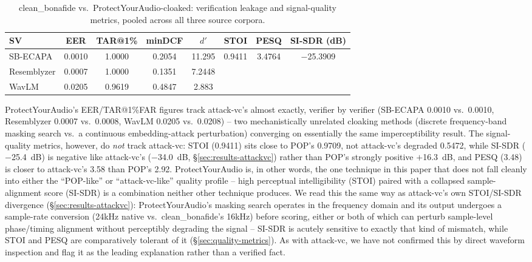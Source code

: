 \documentclass[11pt]{article}
\begin{document}
\begin{table}[H]
\centering
\caption{clean\_bonafide vs.\ ProtectYourAudio-cloaked: verification
leakage and signal-quality metrics, pooled across all three source
corpora.}
\label{tab:results-protectyouraudio}
\begin{tabular}{lccccccc}
\toprule
SV & EER & TAR@1\% & minDCF & $d'$ & STOI & PESQ & SI-SDR (dB) \\
\midrule
SB-ECAPA     & 0.0010 & 1.0000 & 0.2054 & 11.295 & \multirow{3}{*}{0.9411} & \multirow{3}{*}{3.4764} & \multirow{3}{*}{$-$25.3909} \\
Resemblyzer  & 0.0007 & 1.0000 & 0.1351 & 7.2448 & & & \\
WavLM        & 0.0205 & 0.9619 & 0.4847 & 2.883  & & & \\
\bottomrule
\end{tabular}
\end{table}

ProtectYourAudio's EER/TAR@1\%FAR figures track attack-vc's almost
exactly, verifier by verifier (SB-ECAPA 0.0010 vs.\ 0.0010,
Resemblyzer 0.0007 vs.\ 0.0008, WavLM 0.0205 vs.\ 0.0208) -- two
mechanistically unrelated cloaking methods (discrete frequency-band
masking search vs.\ a continuous embedding-attack perturbation)
converging on essentially the same imperceptibility result. The
signal-quality metrics, however, do \emph{not} track attack-vc: STOI
(0.9411) sits close to POP's 0.9709, not attack-vc's degraded 0.5472,
while SI-SDR ($-$25.4~dB) is negative like attack-vc's ($-$34.0~dB,
\S\ref{sec:results-attackvc}) rather than POP's strongly positive
$+$16.3~dB, and PESQ (3.48) is closer to attack-vc's 3.58 than POP's
2.92. ProtectYourAudio is, in other words, the one technique in this
paper that does not fall cleanly into either the ``POP-like'' or
``attack-vc-like'' quality profile -- high perceptual intelligibility
(STOI) paired with a collapsed sample-alignment score (SI-SDR) is a
combination neither other technique produces. We read this the same
way as attack-vc's own STOI/SI-SDR divergence
(\S\ref{sec:results-attackvc}): ProtectYourAudio's masking search
operates in the frequency domain and its output undergoes a
sample-rate conversion (24kHz native vs.\ clean\_bonafide's 16kHz)
before scoring, either or both of which can perturb sample-level
phase/timing alignment without perceptibly degrading the signal --
SI-SDR is acutely sensitive to exactly that kind of mismatch, while
STOI and PESQ are comparatively tolerant of it
(\S\ref{sec:quality-metrics}). As with attack-vc, we have not
confirmed this by direct waveform inspection and flag it as the
leading explanation rather than a verified fact.
\end{document}
